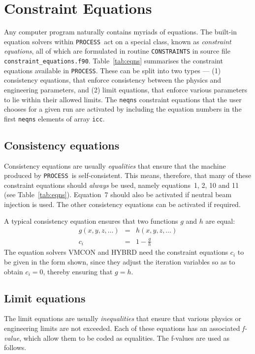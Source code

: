 \documentclass[11pt,a4paper]{report}
\newcommand{\process}{\mbox{\texttt{PROCESS}}}
\begin{document}
\section{Constraint Equations}
\label{sec:constraints}

Any computer program naturally contains myriads of equations. The built-in
equation solvers within \process\ act on a special class, known as
\textit{constraint equations}, all of which are formulated in routine
\texttt{CONSTRAINTS} in source file
\texttt{constraint\_equations.f90}. Table~\ref{tab:eqns} summarises the
constraint equations available in \process. These can be split into two types
--- (1) consistency equations, that enforce consistency between the physics
and engineering parameters, and (2) limit equations, that enforce various
parameters to lie within their allowed limits. The \texttt{neqns} constraint
equations that the user chooses for a given run are activated by including the
equation numbers in the first \texttt{neqns} elements of array \texttt{icc}.

\subsection{Consistency equations}

Consistency equations are usually \textit{equalities}\/ that ensure that the
machine produced by \process\ is self-consistent. This means, therefore, that
many of these constraint equations should \textit{always}\/ be used, namely
equations~1, 2, 10 and 11 (see Table~\ref{tab:eqns}).  Equation~7 should also
be activated if neutral beam injection is used.  The other consistency
equations can be activated if required.

A typical consistency equation ensures that two functions $g$ and $h$ are
equal:
\begin{eqnarray*}
g(x,y,z,\ldots) & = & h(x,y,z,\ldots) \\
c_i & = & 1 - \frac{g}{h}
\end{eqnarray*}
The equation solvers VMCON and HYBRD need the constraint equations $c_i$ to be
given in the form shown, since they adjust the iteration variables so as to
obtain $c_i = 0$, thereby ensuring that $g = h$.

\subsection{Limit equations}

The limit equations are usually \textit{inequalities}\/ that ensure that
various physics or engineering limits are not exceeded. Each of these
equations has an associated \textit{f-value}, which allow them to be coded as
equalities. The f-values are used as follows.
\end{document}
